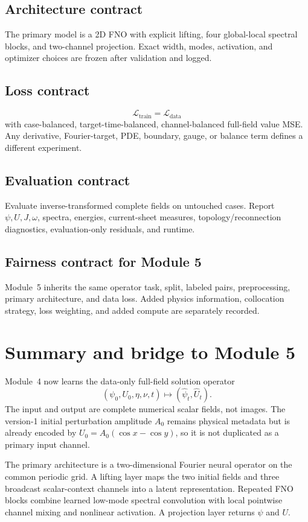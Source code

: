 \documentclass[11pt]{article}
\newcommand{\Ldata}{\mathcal{L}_{\mathrm{data}}}
\newcommand{\Ltrain}{\mathcal{L}_{\mathrm{train}}}
\begin{document}
\subsection{Architecture contract}
The primary model is a 2D FNO with explicit lifting, four global-local spectral blocks, and two-channel projection. Exact width, modes, activation, and optimizer choices are frozen after validation and logged.

\subsection{Loss contract}
\[
\Ltrain=\Ldata
\]
with case-balanced, target-time-balanced, channel-balanced full-field value MSE. Any derivative, Fourier-target, PDE, boundary, gauge, or balance term defines a different experiment.

\subsection{Evaluation contract}
Evaluate inverse-transformed complete fields on untouched cases. Report $\psi,U,J,\omega$, spectra, energies, current-sheet measures, topology/reconnection diagnostics, evaluation-only residuals, and runtime.

\subsection{Fairness contract for Module 5}
Module~5 inherits the same operator task, split, labeled pairs, preprocessing, primary architecture, and data loss. Added physics information, collocation strategy, loss weighting, and added compute are separately recorded.

\section{Summary and bridge to Module 5}
\label{sec:summary}

Module~4 now learns the data-only full-field solution operator
\[
(\psi_0,U_0,\eta,\nu,t)\mapsto(\widehat\psi_t,\widehat U_t).
\]
The input and output are complete numerical scalar fields, not images. The version-1 initial perturbation amplitude $A_0$ remains physical metadata but is already encoded by $U_0=A_0(\cos x-\cos y)$, so it is not duplicated as a primary input channel.

The primary architecture is a two-dimensional Fourier neural operator on the common periodic grid. A lifting layer maps the two initial fields and three broadcast scalar-context channels into a latent representation. Repeated FNO blocks combine learned low-mode spectral convolution with local pointwise channel mixing and nonlinear activation. A projection layer returns $\psi$ and $U$.
\end{document}
